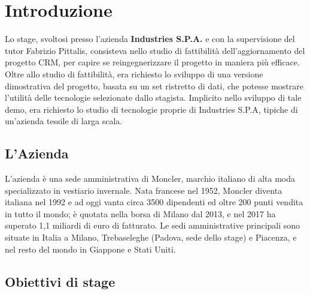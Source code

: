 \pagestyle{fancy}
\fancyhf{}
\fancyhead{}
\fancyhead[RO, LE] {\thepage}
\fancyfoot{}

\section{Introduzione}
Lo stage, svoltosi presso l'azienda \textbf{Industries S.P.A.} e con la supervisione del tutor Fabrizio Pittalis, consisteva nello studio di fattibilità dell'aggiornamento del progetto CRM, per capire se reingegnerizzare il progetto in maniera più efficace.
Oltre allo studio di fattibilità, era richiesto lo sviluppo di una versione dimostrativa del progetto, basata su un set ristretto di dati, che potesse mostrare l'utilità delle tecnologie selezionate dallo stagista.
Implicito nello sviluppo di tale demo, era richiesto lo studio di tecnologie proprie di Industries S.P.A, tipiche di un'azienda tessile di larga scala.

\subsection{L'Azienda}
L'azienda è una sede amministrativa di Moncler, marchio italiano di alta moda specializzato in vestiario invernale.
Nata francese nel 1952, Moncler diventa italiana nel 1992 e ad oggi vanta circa 3500 dipendenti ed oltre 200 punti vendita in tutto il mondo; è quotata nella borsa di Milano dal 2013, e nel 2017 ha superato 1,1 miliardi di euro di fatturato.
Le sedi amministrative principali sono situate in Italia a Milano, Trebaseleghe (Padova, sede dello stage) e Piacenza, e nel resto del mondo in Giappone e Stati Uniti.

\subsection{Obiettivi di stage}
